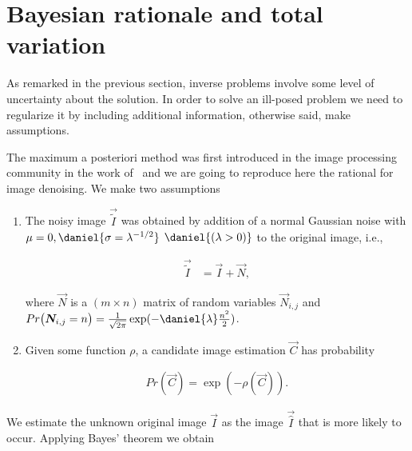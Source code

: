 \section{Bayesian rationale and total variation}
\label{ch1:sec:bayesian-rationale}
As remarked in the previous section, inverse problems involve some level of uncertainty about the solution. In order to solve an ill-posed problem we need to regularize it by including additional information, otherwise said, make assumptions.

The maximum a posteriori method was first introduced in the image processing community in the work of~\cite{geman84} and we are going to reproduce here the rational for image denoising. We make two assumptions

\begin{enumerate}
	\item{The noisy image $\vec{\widetilde{I}}$ was obtained by addition of a normal Gaussian noise with $\mu=0,\daniel{\sigma=\lambda^{-1/2}}$ $\daniel{(\lambda>0)}$ to the original image, i.e., 
		\begin{assumption}
		\begin{align}
			\vec{\widetilde{I}} &= \vec{I} + \vec{N},
		\label{ch1:denoising-assumption-1}
		\end{align} 
		\end{assumption}
where $\vec{N}$ is a $(m \times n)$ matrix of random variables $\vec{N}_{i,j}$ and $Pr\big( \vec{N}_{i,j} = n \big) = \frac{1}{\sqrt{2\pi}}\exp(- \daniel{ \lambda } \frac{n^2}{2} )$.		
	}
	\item{Given some function $\rho$, a candidate image estimation $\vec{C}$ has probability
	
	\begin{assumption}
	\begin{align}
		Pr(\vec{C}) = \exp(-\rho(\vec{C})).
		\label{ch1:denoising-assumption-2}
	\end{align}	 
	\end{assumption}
	}
\end{enumerate}


 We estimate the unknown original image $\vec{I}$ as the image $\vec{\widehat{I}}$ that is more likely to occur. Applying Bayes' theorem we obtain

